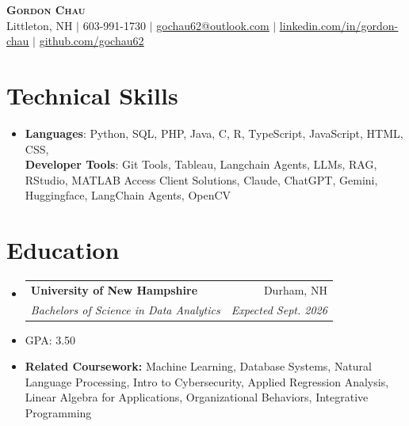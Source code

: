 \documentclass[letterpaper,11pt]{article}
\makeatletter
\newcommand{\resumeItem}[1]{
  \item\small{
    {#1 \vspace{-2pt}}
  }
}
\newcommand{\resumeSubheading}[4]{
  \vspace{-2pt}\item
    \begin{tabular*}{0.97\textwidth}[t]{l@{\extracolsep{\fill}}r}
      \textbf{#1} & #2 \\
      \textit{\small#3} & \textit{\small #4} \\
    \end{tabular*}\vspace{-7pt}
}
\newcommand{\resumeSubHeadingListStart}{\begin{itemize}[leftmargin=0.15in, label={}]}
\newcommand{\resumeSubHeadingListEnd}{\end{itemize}}
\makeatother
\begin{document}

\begin{center}
    \textbf{\Huge \scshape Gordon Chau} \\ \vspace{1pt}
    \small Littleton, NH $|$ 603-991-1730 $|$ \href{mailto:gochau62@outlook.com}{\underline{gochau62@outlook.com}} $|$ 
    \href{https://www.linkedin.com/in/gordon-chau1}{\underline{linkedin.com/in/gordon-chau}} $|$
    \href{https://github.com/gochau62}{\underline{github.com/gochau62}}
\end{center}

%
\section{Technical Skills}
 \begin{itemize}[leftmargin=0.15in, label={}]
    \item \small{
     \textbf{Languages}{: Python, SQL, PHP, Java, C, R, TypeScript, JavaScript, HTML, CSS,} \\
     \textbf{Developer Tools}{: Git Tools, Tableau, Langchain Agents, LLMs, RAG, RStudio, MATLAB Access Client Solutions, Claude, ChatGPT, Gemini, Huggingface, LangChain Agents, OpenCV}
    }
 \end{itemize}

\section{Education}
  \resumeSubHeadingListStart
    \resumeSubheading
    {University of New Hampshire} {Durham, NH}
    {Bachelors of Science in Data Analytics}{Expected Sept. 2026}
    \resumeItem{GPA: 3.50}
     \resumeItem{\textbf{Related Coursework:}
    {Machine Learning, Database Systems, Natural Language Processing, Intro to Cybersecurity, Applied Regression Analysis, Linear Algebra for Applications, Organizational Behaviors, Integrative Programming}}
    \
    \
  \resumeSubHeadingListEnd
\end{document}
